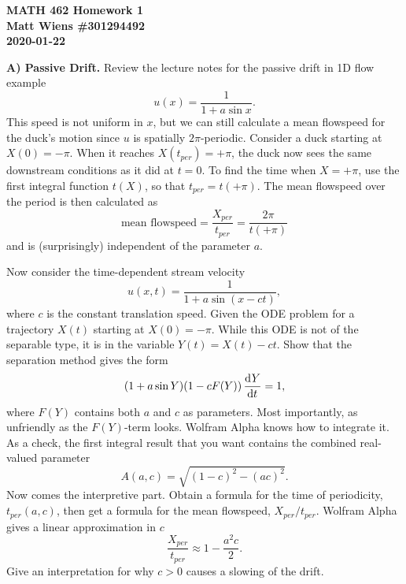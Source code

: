 \documentclass{article}
\begin{document}
\textbf{MATH 462 Homework 1} \\
\textbf{Matt Wiens \#301294492} \\
\textbf{2020-01-22}

\textbf{A) Passive Drift.} Review the lecture notes for the passive
drift in 1D flow example
%
\begin{equation*}
    u(x) = \frac{1}{1 + a \sin x}
    .
\end{equation*}
%
This speed is not uniform in $x$, but we can still calculate a mean
flowspeed for the duck's motion since $u$ is spatially $2 \pi$-periodic.
Consider a duck starting at $X(0) = - \pi$. When it reaches $X(t_{per})
= + \pi$, the duck now sees the same downstream conditions as it did at
$t = 0$. To find the time when $X = + \pi$, use the first integral
function $t(X)$, so that $t_{per} = t(+\pi)$. The mean flowspeed over
the period is then calculated as
%
\begin{equation*}
    \text{mean flowspeed} = \frac{X_{per}}{t_{per}} = \frac{2 \pi}{t (+ \pi)}
\end{equation*}
%
and is (surprisingly) independent of the parameter $a$.

Now consider the time-dependent stream velocity
%
\begin{equation*}
    u(x, t) = \frac{1}{1 + a \sin (x - c t)}
    ,
\end{equation*}
%
where $c$ is the constant translation speed. Given the ODE problem for a
trajectory $X(t)$ starting at $X(0) = - \pi$. While this ODE is not of
the separable type, it is in the variable $Y(t) = X(t) - c t$. Show that
the separation method gives the form
%
\begin{equation*}
    (1 + a \sin Y) (1 - c F(Y)) \dod{Y}{t} = 1
    ,
\end{equation*}
%
where $F(Y)$ contains both $a$ and $c$ as parameters. Most importantly,
as unfriendly as the $F(Y)$-term looks. Wolfram Alpha knows how to
integrate it. As a check, the first integral result that you want
contains the combined real-valued parameter
%
\begin{equation*}
    A(a, c) = \sqrt{(1 - c)^2 - (ac)^2}
    .
\end{equation*}
%
Now comes the interpretive part. Obtain a formula for the time of
periodicity, $t_{per}(a, c)$, then get a formula for the mean flowspeed,
$X_{per}/t_{per}$. Wolfram Alpha gives a linear approximation in $c$
%
\begin{equation*}
    \frac{X_{per}}{t_{per}} \approx 1 - \frac{a^2 c}{2}
    .
\end{equation*}
%
Give an interpretation for why $c > 0$ causes a slowing of the drift.
\end{document}
